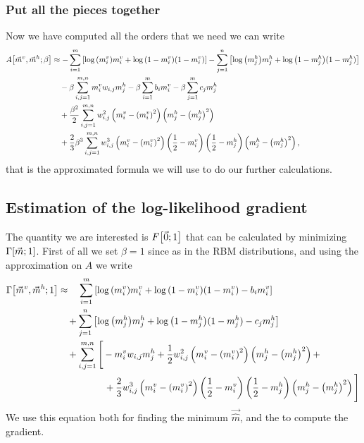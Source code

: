 \subsubsection{Put all the pieces together}
Now we have computed all the orders that we need we can write
\begin{align*}
A{\left[\vec{m}^v, \vec{m}^h;\beta\right]} &\approx
  -\sum_{i=1}^{m}\left[\log{\left(m_i^v\right)}m_i^v + \log{\left(1-m_i^v\right)}(1-m_i^v)\right]
  -\sum_{j=1}^{n}\left[\log{\left(m_j^h\right)}m_j^h + \log{\left(1-m_j^h\right)}(1-m_j^h)\right]\\
  &\quad-\beta \sum_{i,j=1}^{m,n}m_i^v w_{i,j} m_j^h -\beta\sum_{i=1}^{m} b_im_i^v -\beta\sum_{j=1}^{m} c_jm_j^h\\
  &\quad+\frac{\beta^2}{2}
  \sum_{i,j=1}^{m,n} w_{i,j}^2\left(m_i^v-{\left(m_i^v\right)}^2\right)\left(m_j^h-{\left(m_j^h\right)}^2\right)\\
  &\quad+\frac{2}{3}\beta^3 
    \sum_{i,j=1}^{m,n} w_{i,j}^3\left(m_i^v-{\left(m_i^v\right)}^2\right) \left(\frac{1}{2}-m_i^v\right)
    \left(\frac{1}{2}-m_j^h\right) \left(m_j^h-{\left(m_j^h\right)}^2\right),
\end{align*}
that is the approximated formula we will use to do our further calculations.

\subsection{Estimation of the log-likelihood gradient}
The quantity we are interested is \(F{\left[\vec{0};1\right]}\) that can be calculated by minimizing \(\Gamma{\left[\vec{m};1\right]}\).
First of all we set \(\beta=1\) since as in the RBM distributions, and using the approximation
on \(A\) we write
\begin{align*}
  \Gamma{\left[\vec{m}^v, \vec{m}^h;1\right]} &\approx
    \quad\sum_{i=1}^{m}\left[\log{\left(m_i^v\right)}m_i^v + \log{\left(1-m_i^v\right)}(1-m_i^v)-b_im_i^v\right]\\
    &\quad+\sum_{j=1}^{n}\left[\log{\left(m_j^h\right)}m_j^h+\log{\left(1-m_j^h\right)}(1-m_j^h)-c_jm_j^h\right]\\
    &\quad+\sum_{i,j=1}^{m,n}\Bigg[
      -m_i^v w_{i,j}m_j^h
      +\frac{1}{2}w_{i,j}^2\left(m_i^v-{\left(m_i^v\right)}^2\right)\left(m_j^h-{\left(m_j^h\right)}^2\right)+\\
      &\qquad\qquad\quad+\frac{2}{3}w_{i,j}^3\left(m_i^v-{\left(m_i^v\right)}^2\right)\left(\frac{1}{2}-m_i^v\right)\left(\frac{1}{2}-m_j^h\right)
        \left(m_j^h-{\left(m_j^h\right)}^2\right)
    \Bigg]
\end{align*}
We use this equation both for finding the minimum \(\vec{\hat{m}}\), and the to compute the gradient.

